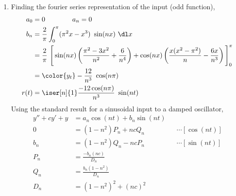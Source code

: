 \begin{enumerate}
    \item Finding the fourier series representation of the input (odd function),
          \begin{align}
              a_0  & = 0 \qquad\qquad a_n = 0                                         \\
              b_n  & = \frac{2}{\pi} \int_{0}^{\pi} (\pi^2 x - x^3)\ \sin(nx)\ \dl x  \\
                   & = \frac{2}{\pi}\ \Bigg[ \sin(nx) \left( \frac{\pi^2 - 3x^2}{n^2}
                  + \frac{6}{n^4} \right) +
                  \cos(nx) \left( \frac{x(x^2 - \pi^2)}{n} - \frac{6x}{n^3} \right)
              \Bigg]_{0}^{\pi}                                                        \\
                   & = \color{y_t} -\frac{12}{n^3}\ \cos(n\pi)                        \\
              r(t) & = \iser[n]{1} \frac{-12\cos(n\pi)}{n^3}\ \sin(nt)
          \end{align}
          Using the standard result for a sinusoidal input to a damped oscillator,
          \begin{align}
              y'' + cy' + y & = a_n \cos(nt) + b_n \sin(nt)   \\
              0             & = (1 - n^2)P_n + nc Q_n       &
                            & \cdots[\cos(nt)]                \\
              b_n           & = (1 - n^2)Q_n - nc P_n       &
                            & \cdots[\sin(nt)]                \\
              P_n           & = \frac{- b_n (nc)}{D_n}        \\
              Q_n           & = \frac{b_n (1 - n^2)}{D_n}     \\
              D_n           & = (1 - n^2)^2 + (nc)^2
          \end{align}
          \begin{figure}[H]
              \centering
          \end{figure}


\end{enumerate}
